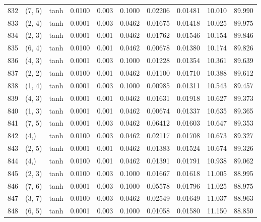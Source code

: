 \begin{tabular}{lllrrrrrrr}
832 &      (7, 5) &      tanh &  0.0100 &  0.003 &  0.1000 &          0.02206 &    0.01481 &      10.010 &    89.990 \\
833 &      (2, 4) &      tanh &  0.0001 &  0.003 &  0.0462 &          0.01675 &    0.01418 &      10.025 &    89.975 \\
834 &      (2, 3) &      tanh &  0.0001 &  0.001 &  0.0462 &          0.01762 &    0.01546 &      10.154 &    89.846 \\
835 &      (6, 4) &      tanh &  0.0100 &  0.001 &  0.0462 &          0.00678 &    0.01380 &      10.174 &    89.826 \\
836 &      (4, 3) &      tanh &  0.0001 &  0.003 &  0.1000 &          0.01228 &    0.01354 &      10.361 &    89.639 \\
837 &      (2, 2) &      tanh &  0.0100 &  0.001 &  0.0462 &          0.01100 &    0.01710 &      10.388 &    89.612 \\
838 &      (1, 4) &      tanh &  0.0001 &  0.003 &  0.1000 &          0.00985 &    0.01311 &      10.543 &    89.457 \\
839 &      (4, 3) &      tanh &  0.0001 &  0.001 &  0.0462 &          0.01631 &    0.01918 &      10.627 &    89.373 \\
840 &      (1, 3) &      tanh &  0.0001 &  0.001 &  0.0462 &          0.00674 &    0.01337 &      10.635 &    89.365 \\
841 &      (7, 5) &      tanh &  0.0001 &  0.003 &  0.0462 &          0.06412 &    0.01603 &      10.647 &    89.353 \\
842 &        (4,) &      tanh &  0.0100 &  0.003 &  0.0462 &          0.02117 &    0.01708 &      10.673 &    89.327 \\
843 &      (2, 5) &      tanh &  0.0001 &  0.001 &  0.0462 &          0.01383 &    0.01524 &      10.674 &    89.326 \\
844 &        (4,) &      tanh &  0.0100 &  0.001 &  0.0462 &          0.01391 &    0.01791 &      10.938 &    89.062 \\
845 &      (2, 3) &      tanh &  0.0100 &  0.003 &  0.1000 &          0.01667 &    0.01618 &      11.005 &    88.995 \\
846 &      (7, 6) &      tanh &  0.0001 &  0.003 &  0.1000 &          0.05578 &    0.01796 &      11.025 &    88.975 \\
847 &      (3, 7) &      tanh &  0.0100 &  0.003 &  0.0462 &          0.02549 &    0.01649 &      11.037 &    88.963 \\
848 &      (6, 5) &      tanh &  0.0001 &  0.003 &  0.1000 &          0.01058 &    0.01580 &      11.150 &    88.850 \\

\end{tabular}
